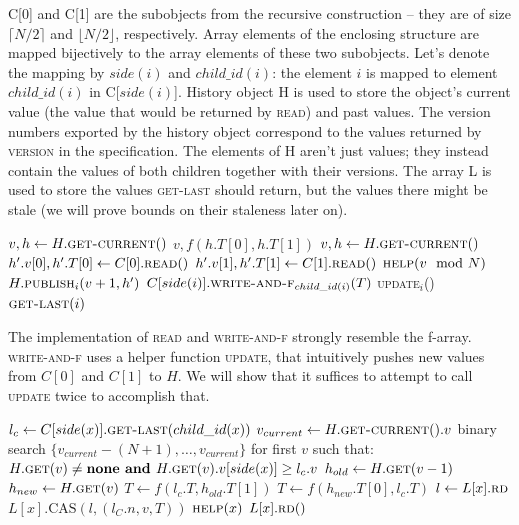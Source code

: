 \documentclass[a4paper,11pt]{article}
\def\none{\textbf{none} }
\newcommand{\fn}[1]{\textsc{#1}}
\begin{document}
C[0] and C[1] are the subobjects from the recursive construction -- they are of size $\lceil{}N/2\rceil{}$ and $\lfloor{}N/2\rfloor{}$, respectively. Array elements of the enclosing
structure are mapped bijectively to the array elements of these two subobjects. Let's denote the mapping by $side(i)$ and $child\_id(i)$: the element $i$ is mapped to element $child\_id(i)$ in C[$side(i)$].
History object H is used to store the object's current value (the value that would be returned by \fn{read}) and past values. The version numbers exported by the history object correspond to the values returned by \fn{version}
in the specification. The elements of H aren't just values; they instead contain the values of both children together with their versions.
The array L is used to store the values \fn{get-last} should return, but the values there might be stale (we will prove bounds on their staleness later on).

\begin{algorithmic}[1]
		\State $v, h \gets H.\fn{get-current}()$ \label{get-getownver}
		\State \Return $v, f(h.T[0], h.T[1])$
	\EndFunction
		\State $v, h \gets H.\fn{get-current}()$ \label{upd-getown}
		\State $h'.v[0], h'.T[0] \gets C[0].\fn{read}()$ \label{upd-getch-0}
		\State $h'.v[1], h'.T[1] \gets C[1].\fn{read}()$ \label{upd-getch-1}
		\State $\fn{help}(v \mod N)$
		\State \Return $H.\fn{publish$_i$}(v+1, h')$ \label{upd-publish}
	\EndFunction
		\State $C[side(i)].\fn{write-and-f$_{child\_id(i)}$}(T)$ \label{upd-chupd}
		\If{\textbf{not} \fn{update$_i$}()} \label{updcall1}
		\State \fn{update$_i$}() \label{updcall2}
		\EndIf
		\State \Return $\fn{get-last}(i)$
	\EndFunction
\end{algorithmic}

The implementation of \fn{read} and \fn{write-and-f} strongly resemble the f-array. \fn{write-and-f} uses a helper function \fn{update}, that intuitively pushes new values from $C[0]$ and $C[1]$ to $H$.
We will show that it suffices to attempt to call \fn{update} twice to accomplish that.

\begin{algorithmic}[1]
		\State $l_c \gets C[side(x)].\fn{get-last}(child\_id(x))$ \label{get-last-recurse}
		\State $v_{current} \gets H.\fn{get-current}().v$
		\State binary search $\{v_{current}-(N+1),\ldots, v_{current}\}$ for first $v$ such that: \label{help-binsch}
		\Statex $H.\fn{get}(v) \neq \none \textbf{ and } H.\fn{get}(v).v[side(x)] \geq l_c.v$ %
			\State \Return
		\EndIf
		\State $h_{old} \gets H.\fn{get}(v-1)$ \label{help-getprev}
		\State $h_{new} \gets H.\fn{get}(v)$
		\If{$h_{old} = \none \textbf{ or } h_{new} = \none$}
			\State \Return
		\EndIf
			\State $T \gets f(l_c.T, h_{old}.T[1])$
		\Else
			\State $T \gets f(h_{new}.T[0], l_c.T)$
		\EndIf
		\State $l \gets L[x].\fn{rd}$
		 \label{upd-last-alreadydone}
			\State $L[x].\text{CAS}(l, (l_C.n, v, T))$
		\EndIf
	\EndFunction
		\State $\fn{help}(x)$
		\State \Return $L[x].\fn{rd}()$
	\EndFunction
\end{algorithmic}
\end{document}
